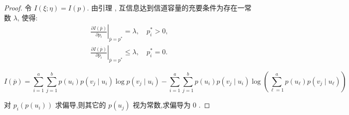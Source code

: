 \begin{proof}
 令 $ I(\xi ; \eta)=I(p) $. 由引理 , 互信息达到信道容量的充要条件为存在一常数 $ \lambda $, 使得:
$$
\begin{aligned}
\left.\frac{\partial I(\overline{p})}{\partial p_{i}}\right|_{\overline{p}=p^{*}}=\lambda, \quad p_{i}^{*}>0, \\
\left.\frac{\partial I(\overline{p})}{\partial p_{i}}\right|_{\overline{p}=p^{*}} \leq \lambda, \quad p_{i}^{*}=0 . 
\end{aligned}
$$

$$I(\overline{p})=\sum_{i=1}^{a} \sum_{j=1}^{b} p\left(u_{i}\right) p\left(v_{j} \mid u_{i}\right) \log p\left(v_{j} \mid u_{i}\right)- 
\sum_{i=1}^{a} \sum_{j=1}^{b} p\left(u_{i}\right) p\left(v_{j} \mid u_{i}\right) \log \left(\sum_{\ell=1}^{a} p\left(u_{\ell}\right) p\left(v_{j} \mid u_{\ell}\right)\right)$$

对 $ p_{i}\left(p\left(u_{i}\right)\right) $ 求偏导,则其它的 $ p\left(u_{j}\right) $ 视为常数,求偏导为 0 .


\end{proof}
